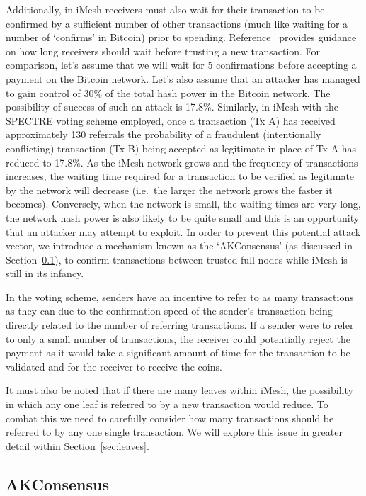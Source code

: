 \documentclass[a4paper,10pt,twocolumn]{article}
\begin{document}
 Additionally, in iMesh receivers must also wait for their transaction to be confirmed by a sufficient number of other transactions 
 (much like waiting for a number of `confirms' in Bitcoin) prior to spending. Reference~\cite{spectre} provides guidance on how long receivers 
 should wait before trusting a new transaction. For comparison, let's assume that we will wait for 5 confirmations before accepting a 
 payment on the Bitcoin network. Let's also assume that an attacker has managed to gain control of 30\% of the total hash power in the 
 Bitcoin network. The possibility of success of such an attack is 17.8\%\cite{btc}. Similarly, in iMesh with the SPECTRE voting scheme 
 employed, once a transaction (Tx A) has received approximately 130 referrals the probability of a fraudulent (intentionally conflicting) 
 transaction (Tx B) being accepted as legitimate in place of Tx A has reduced to 17.8\%. As the iMesh network grows and the frequency of 
 transactions increases, the waiting time required for a transaction to be verified as legitimate by the network will decrease (i.e.\ the 
 larger the network grows the faster it becomes). Conversely, when the network is small, the waiting times are very long, the 
 network hash power is also likely to be quite small and this is an opportunity that an attacker may attempt to exploit. 
In order to prevent this potential attack vector, we introduce a mechanism known as the `AKConsensus' (as discussed in Section~\ref{sec:AKConsensus}), 
to confirm transactions between trusted full-nodes while iMesh is still in its infancy.

In the voting scheme, senders have an incentive to refer to as many transactions as they can due to the confirmation speed of the 
sender's transaction being directly related to the number of referring transactions. If a sender were to refer to only a small number of 
transactions, the receiver could potentially reject the payment as it would take a significant amount of time for the transaction to be 
validated and for the receiver to receive the coins.

It must also be noted that if there are many leaves within iMesh, the possibility in which any one leaf is referred to by a new 
transaction would reduce. To combat this we need to carefully consider how many transactions should be referred to by any one single 
transaction. We will explore this issue in greater detail within Section~\ref{sec:leaves}.

\subsection{AKConsensus}
\label{sec:AKConsensus}
\end{document}

